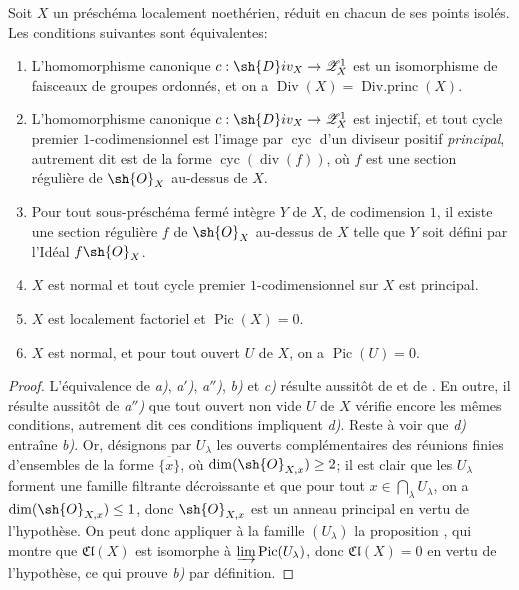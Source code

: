 \begin{corollary}[21.7.6]
\label{IV.21.7.6}
Soit $X$ un préschéma localement noethérien, réduit en chacun de ses points isolés.
Les conditions suivantes sont équivalentes:
\begin{enumerate}
  \item[\emph{a)}] L'homomorphisme canonique $c:\sh{D}iv_X\to\mathscr{Z}_X^1$ est un isomorphisme de faisceaux de groupes ordonnés, et on a $\operatorname{Div}(X)=\operatorname{Div.princ}(X)$.
  \item[\emph{a$'$)}] L'homomorphisme canonique $c:\sh{D}iv_X\to\mathscr{Z}_X^1$ est injectif, et tout cycle premier $1$-codimensionnel est l'image par $\operatorname{cyc}$ d'un diviseur positif \emph{principal}, autrement dit est de la forme $\operatorname{cyc}(\operatorname{div}(f))$, où $f$ est une section régulière de $\sh{O}_X$ au-dessus de $X$.
  \item[\emph{a$''$)}] Pour tout sous-préschéma fermé intègre $Y$ de $X$, de codimension $1$, il existe une section régulière $f$ de $\sh{O}_X$ au-dessus de $X$ telle que $Y$ soit défini par l'Idéal $f\sh{O}_X$.
  \item[\emph{b)}] $X$ est normal et tout cycle premier $1$-codimensionnel sur $X$ est principal.
  \item[\emph{c)}] $X$ est localement factoriel et $\operatorname{Pic}(X)=0$.
  \item[\emph{d)}] $X$ est normal, et pour tout ouvert $U$ de $X$, on a $\operatorname{Pic}(U)=0$.
\end{enumerate}
\end{corollary}

\begin{proof}
L'équivalence de \emph{a)}, \emph{a$'$)}, \emph{a$''$)}, \emph{b)} et \emph{c)} résulte aussitôt de  et de .
En outre, il résulte aussitôt de \emph{a$''$)} que tout ouvert non vide $U$ de $X$ vérifie encore les mêmes conditions, autrement dit ces conditions impliquent \emph{d)}.
Reste à voir que \emph{d)} entraîne \emph{b)}.
Or, désignons par $U_\lambda$ les ouverts complémentaires des réunions finies d'ensembles de la forme $\overline{\{x\}}$, où $\dim(\sh{O}_{X,x})\geq2$;
il est clair que les $U_\lambda$ forment une famille filtrante décroissante et que pour tout $x\in\bigcap_\lambda U_\lambda$, on a $\dim(\sh{O}_{X,x})\leq1$, donc $\sh{O}_{X,x}$ est un anneau principal en vertu de l'hypothèse.
On peut donc appliquer à la famille $(U_\lambda)$ la proposition , qui montre que $\mathfrak{Cl}(X)$ est isomorphe à $\varinjlim\operatorname{Pic}(U_\lambda)$, donc $\mathfrak{Cl}(X)=0$ en vertu de l'hypothèse, ce qui prouve \emph{b)} par définition.
\end{proof}

